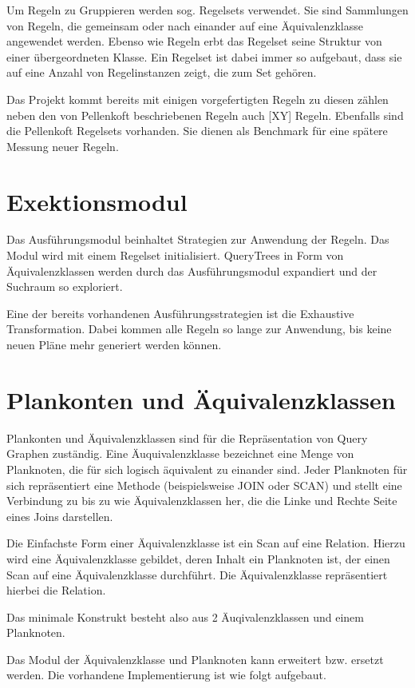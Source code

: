 Um Regeln zu Gruppieren werden sog. Regelsets verwendet. Sie sind Sammlungen von Regeln, die gemeinsam oder nach einander auf eine Äquivalenzklasse angewendet werden. Ebenso wie Regeln erbt das Regelset seine Struktur von einer übergeordneten Klasse. Ein Regelset ist dabei immer so aufgebaut, dass sie auf eine Anzahl von Regelinstanzen zeigt, die zum Set gehören.

Das Projekt kommt bereits mit einigen vorgefertigten Regeln zu diesen zählen neben den von Pellenkoft \cite{} beschriebenen Regeln auch [XY] Regeln. Ebenfalls sind die Pellenkoft Regelsets vorhanden. Sie dienen als Benchmark für eine spätere Messung neuer Regeln.


\section{Exektionsmodul}

Das Ausführungsmodul beinhaltet Strategien zur Anwendung der Regeln. Das Modul wird mit einem Regelset initialisiert. QueryTrees in Form von Äquivalenzklassen werden durch das Ausführungsmodul expandiert und der Suchraum so exploriert.

Eine der bereits vorhandenen Ausführungsstrategien ist die Exhaustive Transformation. Dabei kommen alle Regeln so lange zur Anwendung, bis keine neuen Pläne mehr generiert werden können.


\section{Plankonten und Äquivalenzklassen}

Plankonten und Äquivalenzklassen sind für die Repräsentation von Query Graphen zuständig. Eine Äuquivalenzklasse bezeichnet eine Menge von Planknoten, die für sich logisch äquivalent zu einander sind. Jeder Planknoten für sich repräsentiert eine Methode (beispielsweise JOIN oder SCAN) und stellt eine Verbindung zu bis zu wie Äquivalenzklassen her, die die Linke und Rechte Seite eines Joins darstellen.

Die Einfachste Form einer Äquivalenzklasse ist ein Scan auf eine Relation. Hierzu wird eine Äquivalenzklasse gebildet, deren Inhalt ein Planknoten ist, der einen Scan auf eine Äquivalenzklasse durchführt. Die Äquivalenzklasse repräsentiert hierbei die Relation.

Das minimale Konstrukt besteht also aus 2 Äuqivalenzklassen und einem Planknoten.


Das Modul der Äquivalenzklasse und Planknoten kann erweitert bzw. ersetzt werden. Die vorhandene Implementierung ist wie folgt aufgebaut.
